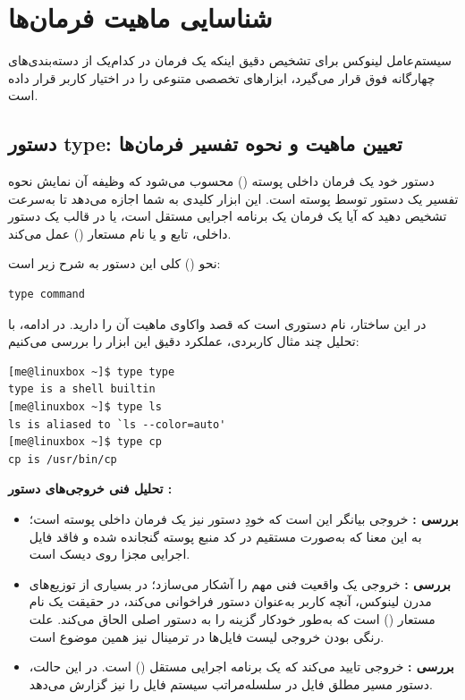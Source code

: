 \section{شناسایی ماهیت فرمان‌ها}

سیستم‌عامل لینوکس برای تشخیص دقیق اینکه یک فرمان در کدام‌یک از دسته‌بندی‌های چهارگانه فوق قرار می‌گیرد، ابزارهای تخصصی متنوعی را در اختیار کاربر قرار داده است.

\subsection{دستور type: تعیین ماهیت و نحوه تفسیر فرمان‌ها}

دستور  خود یک فرمان داخلی پوسته () محسوب می‌شود که وظیفه آن نمایش نحوه تفسیر یک دستور توسط پوسته است. این ابزار کلیدی به شما اجازه می‌دهد تا به‌سرعت تشخیص دهید که آیا یک فرمان یک برنامه اجرایی مستقل است، یا در قالب یک دستور داخلی، تابع و یا نام مستعار () عمل می‌کند.

نحو () کلی این دستور به شرح زیر است:

\begin{latin}
\begin{lstlisting}
type command
\end{lstlisting}
\end{latin}

در این ساختار،  نام دستوری است که قصد واکاوی ماهیت آن را دارید. در ادامه، با تحلیل چند مثال کاربردی، عملکرد دقیق این ابزار را بررسی می‌کنیم:

\begin{latin}
\begin{lstlisting}
[me@linuxbox ~]$ type type
type is a shell builtin
[me@linuxbox ~]$ type ls
ls is aliased to `ls --color=auto'
[me@linuxbox ~]$ type cp
cp is /usr/bin/cp
\end{lstlisting}
\end{latin}

\textbf{تحلیل فنی خروجی‌های دستور :}

\begin{itemize}
  \item \textbf{بررسی :} خروجی  بیانگر این است که خودِ دستور  نیز یک فرمان داخلی پوسته است؛ به این معنا که به‌صورت مستقیم در کد منبع پوسته گنجانده شده و فاقد فایل اجرایی مجزا روی دیسک است.

  \item \textbf{بررسی :} خروجی  یک واقعیت فنی مهم را آشکار می‌سازد؛ در بسیاری از توزیع‌های مدرن لینوکس، آنچه کاربر به‌عنوان دستور  فراخوانی می‌کند، در حقیقت یک نام مستعار () است که به‌طور خودکار گزینه  را به دستور اصلی الحاق می‌کند. علت رنگی بودن خروجی لیست فایل‌ها در ترمینال نیز همین موضوع است.

  \item \textbf{بررسی :} خروجی  تایید می‌کند که  یک برنامه اجرایی مستقل () است. در این حالت، دستور  مسیر مطلق فایل در سلسله‌مراتب سیستم فایل را نیز گزارش می‌دهد.
\end{itemize}

